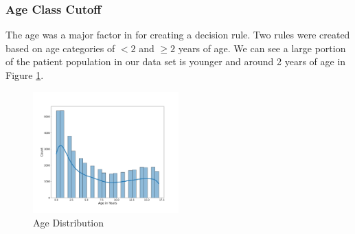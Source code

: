 \documentclass[11pt, letterpaper]{amsart}
\let\Oldsubsubsection\subsubsection
\renewcommand{\subsubsection}{\FloatBarrier\Oldsubsubsection}
\begin{document}
\subsubsection{Age Class Cutoff} \label{sssec:ageclass}

The age was a major factor in \cite{kuppermann2009identification} for creating a decision rule. Two rules were created based on age categories of $< 2$ and $\geq 2$ years of age. We can see a large portion of the patient population in our data set is younger and around 2 years of age in Figure \ref{fig:age_dist}.
\begin{figure}
	\centering
	\includegraphics[width=0.5\textwidth]{age_dist.png}
	\caption{Age Distribution}\label{fig:age_dist}
\end{figure}
\end{document}
